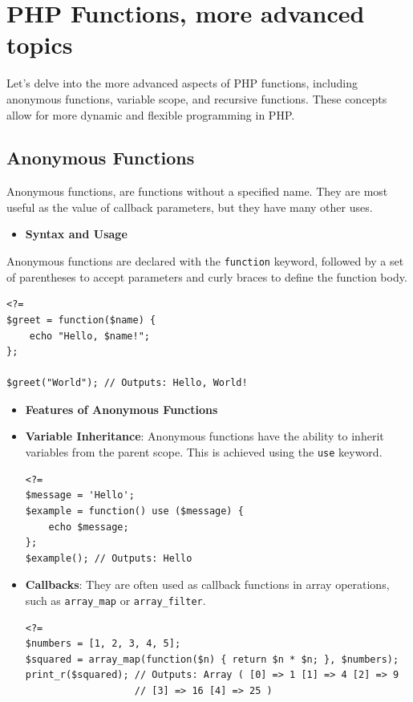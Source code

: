 \documentclass[11pt]{article}
\date{}
\title{}
\begin{document}
\setcounter{tocdepth}{3}
\tableofcontents

\setlength\parindent{10pt}

\section{PHP Functions, more advanced topics}
\label{sec:org122bab2}
Let's delve into the more advanced aspects of PHP functions, including
anonymous functions, variable scope, and recursive functions. These
concepts allow for more dynamic and flexible programming in PHP.

\subsection{Anonymous Functions}
\label{sec:orgf630a5a}
Anonymous functions, are functions without a specified name. They are
most useful as the value of callback parameters, but they have many
other uses.

\begin{itemize}
\item \textbf{Syntax and Usage}
\end{itemize}

Anonymous functions are declared with the \texttt{function} keyword, followed
by a set of parentheses to accept parameters and curly braces to define
the function body.

\begin{verbatim}
<?=
$greet = function($name) {
    echo "Hello, $name!";
};

$greet("World"); // Outputs: Hello, World!
\end{verbatim}

\begin{itemize}
\item \textbf{Features of Anonymous Functions}
\end{itemize}


\begin{itemize}
\item \textbf{Variable Inheritance}: Anonymous functions have the ability to
inherit variables from the parent scope. This is achieved using the
\texttt{use} keyword.

\begin{verbatim}
<?=
$message = 'Hello';
$example = function() use ($message) {
    echo $message;
};
$example(); // Outputs: Hello
\end{verbatim}

\item \textbf{Callbacks}: They are often used as callback functions in array
operations, such as \texttt{array\_map} or \texttt{array\_filter}.

\begin{verbatim}
<?=
$numbers = [1, 2, 3, 4, 5];
$squared = array_map(function($n) { return $n * $n; }, $numbers);
print_r($squared); // Outputs: Array ( [0] => 1 [1] => 4 [2] => 9
                   // [3] => 16 [4] => 25 )
\end{verbatim}
\end{itemize}
\end{document}
